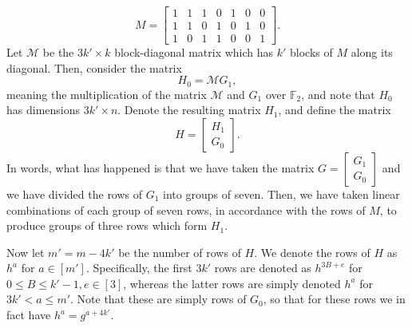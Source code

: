 \documentclass[11pt]{article}
\theoremstyle{definition}
\renewcommand{\le}{\leqslant}
\renewcommand{\leq}{\leqslant}
\newcommand{\cM}{\mathcal{M}}
\begin{document}
\begin{equation}\label{eq:matrix_M}
    M = 
    \begin{bmatrix}
        1 & 1 & 1 & 0 & 1 & 0 & 0 \\
        1 & 1 & 0 & 1 & 0 & 1 & 0 \\
        1 & 0 & 1 & 1 & 0 & 0 & 1
    \end{bmatrix}.
\end{equation}
Let $\cM$ be the $3k'\times k$ block-diagonal matrix which has $k'$ blocks of $M$ along its diagonal.
Then, consider the matrix
\begin{equation}
    H_0 = \cM G_1,
\end{equation}
meaning the multiplication of the matrix $\cM$ and $G_1$ over $\mathbb{F}_2$, and note that $H_0$ has dimensions $3k' \times n$. 
Denote the resulting matrix $H_1$, and define the matrix
\begin{equation}
    H = 
    \begin{bmatrix}
        H_1\\
        G_0
    \end{bmatrix}.
    \label{eq:def_H}
\end{equation}
In words, what has happened is that we have taken the matrix $G = \begin{bmatrix}
    G_1\\G_0
\end{bmatrix}$ and we have divided the rows of $G_1$ into groups of seven. Then, we have taken linear combinations of each group of seven rows, in accordance with the rows of $M$, to produce groups of three rows which form $H_1$. 

Now let $m' = m - 4k'$ be the number of rows of $H$. 
We denote the rows of $H$ as $h^{a}$ for $a\in [m']$. 
Specifically, the first $3k'$ rows are denoted as $h^{3B+e}$ for $0\le B\le k'-1, e\in [3]$, whereas the latter rows are simply denoted $h^a$ for $3k' < a \leq m'$. Note that these are simply rows of $G_0$, so that for these rows we in fact have $h^a = g^{a+4k'}$.
\end{document}
